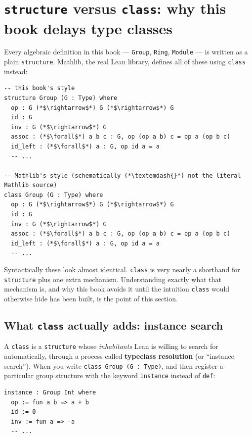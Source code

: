 \section{\texorpdfstring{\texttt{structure} versus \texttt{class}: why this book delays type classes}{structure versus class: why this book delays type classes}}\label{sec:05-rigor-check:01-structure-vs-class:1}

Every algebraic definition in this book --- \texttt{Group}, \texttt{Ring}, \texttt{Module} --- is written as a plain \texttt{structure}. Mathlib, the real Lean library, defines all of these using \texttt{class} instead:

\begin{lstlisting}
-- this book's style
structure Group (G : Type) where
  op : G (*$\rightarrow$*) G (*$\rightarrow$*) G
  id : G
  inv : G (*$\rightarrow$*) G
  assoc : (*$\forall$*) a b c : G, op (op a b) c = op a (op b c)
  id_left : (*$\forall$*) a : G, op id a = a
  -- ...

-- Mathlib's style (schematically (*\textemdash{}*) not the literal Mathlib source)
class Group (G : Type) where
  op : G (*$\rightarrow$*) G (*$\rightarrow$*) G
  id : G
  inv : G (*$\rightarrow$*) G
  assoc : (*$\forall$*) a b c : G, op (op a b) c = op a (op b c)
  id_left : (*$\forall$*) a : G, op id a = a
  -- ...
\end{lstlisting}

Syntactically these look almost identical. \texttt{class} is very nearly a shorthand for \texttt{structure} plus one extra mechanism. Understanding exactly what that mechanism is, and why this book avoids it until the intuition \texttt{class} would otherwise hide has been built, is the point of this section.

\subsection{\texorpdfstring{What \texttt{class} actually adds: instance search}{What class actually adds: instance search}}\label{sec:05-rigor-check:01-structure-vs-class:2}

A \texttt{class} is a \texttt{structure} whose \emph{inhabitants} Lean is willing to search for automatically, through a process called \textbf{typeclass resolution} (or ``instance search''). When you write \texttt{class Group (G : Type)}, and then register a particular group structure with the keyword \texttt{instance} instead of \texttt{def}:

\begin{lstlisting}
instance : Group Int where
  op := fun a b => a + b
  id := 0
  inv := fun a => -a
  -- ...
\end{lstlisting}


